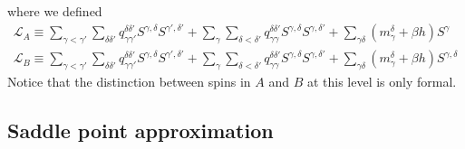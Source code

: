 \documentclass[onecolumn,superscriptaddress,pr]{revtex4}
\begin{document}
%
where we defined 
%
\begin{align}
{\mathcal L}_A\equiv\sum\limits_{\gamma<\gamma'}\sum\limits_{\delta\delta'}
q_{\gamma\gamma'}^{\delta\delta'}S^{\gamma,\delta} 
S^{\gamma',\delta'}+\sum_\gamma\sum\limits_{\delta<\delta'}
q^{\delta\delta'}_{\gamma\gamma}S^{\gamma,\delta}S^{\gamma,\delta'}+
\sum\limits_{\gamma\delta}
(m_\gamma^\delta+\beta h)S^{\gamma}\\
{\mathcal L}_B\equiv\sum\limits_{\gamma<\gamma'}\sum\limits_{\delta\delta'}
q_{\gamma\gamma'}^{\delta\delta'}S^{\gamma,\delta}
S^{\gamma',\delta'}+\sum_\gamma\sum\limits_{\delta<\delta'}
q_{\gamma\gamma}^{\delta\delta'}S^{\gamma,\delta}
S^{\gamma,\delta'}
+\sum\limits_{\gamma\delta}(m_\gamma^\delta+\beta h)
S^{\gamma,\delta}
\end{align}
%
Notice that the distinction between spins in $A$ and $B$ at this level is only 
formal.

\subsection{Saddle point approximation}
\end{document}

